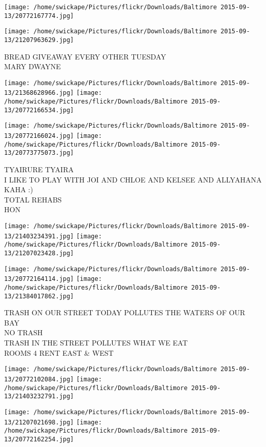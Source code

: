 \documentclass[10pt,letterpaper]{article}
\begin{document}
\texttt{[image: /home/swickape/Pictures/flickr/Downloads/Baltimore 2015-09-13/20772167774.jpg]}

\vspace{0.25in}
\texttt{[image: /home/swickape/Pictures/flickr/Downloads/Baltimore 2015-09-13/21207963629.jpg]}

BREAD GIVEAWAY EVERY OTHER TUESDAY\\
MARY DWAYNE\\
\pagebreak

\texttt{[image: /home/swickape/Pictures/flickr/Downloads/Baltimore 2015-09-13/21368628966.jpg]}
\texttt{[image: /home/swickape/Pictures/flickr/Downloads/Baltimore 2015-09-13/20772166534.jpg]}

\texttt{[image: /home/swickape/Pictures/flickr/Downloads/Baltimore 2015-09-13/20772166024.jpg]}
\texttt{[image: /home/swickape/Pictures/flickr/Downloads/Baltimore 2015-09-13/20773775073.jpg]}

TYAIRURE TYAIRA\\
I LIKE TO PLAY WITH JOI AND CHLOE AND KELSEE AND ALLYAHANA KAHA :)\\
TOTAL REHABS\\
HON\\
\pagebreak

\texttt{[image: /home/swickape/Pictures/flickr/Downloads/Baltimore 2015-09-13/21403234391.jpg]}
\texttt{[image: /home/swickape/Pictures/flickr/Downloads/Baltimore 2015-09-13/21207023428.jpg]}

\texttt{[image: /home/swickape/Pictures/flickr/Downloads/Baltimore 2015-09-13/20772164114.jpg]}
\texttt{[image: /home/swickape/Pictures/flickr/Downloads/Baltimore 2015-09-13/21384017862.jpg]}

TRASH ON OUR STREET TODAY POLLUTES THE WATERS OF OUR BAY\\
NO TRASH\\
TRASH IN THE STREET POLLUTES WHAT WE EAT\\
ROOMS 4 RENT EAST \& WEST\\
\pagebreak

\texttt{[image: /home/swickape/Pictures/flickr/Downloads/Baltimore 2015-09-13/20772102084.jpg]}
\texttt{[image: /home/swickape/Pictures/flickr/Downloads/Baltimore 2015-09-13/21403232791.jpg]}

\texttt{[image: /home/swickape/Pictures/flickr/Downloads/Baltimore 2015-09-13/21207021698.jpg]}
\texttt{[image: /home/swickape/Pictures/flickr/Downloads/Baltimore 2015-09-13/20772162254.jpg]}
\end{document}
